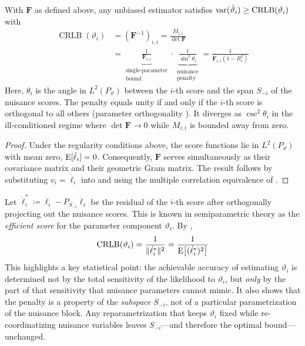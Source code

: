 \documentclass{IEEEtran}
\begin{document}
\begin{corollary}
  \label{cor:crb}
  With $\mathbf{F}$ as defined above, any unbiased estimator satisfies $\operatorname{var}(\hat{\vartheta}_{i}) \ge \operatorname{CRLB}(\vartheta_{i})$ with
  \begin{equation}\label{eq:crb-angle}
    \begin{aligned}
      \operatorname{CRLB}(\vartheta_{i})
      &= (\mathbf{F}^{-1})_{i,i}
      = \frac{M_{i,i}}{\det \mathbf{F}} \\
      &= \underbrace{\frac{1}{\mathbf{F}_{i,i}}}_{\substack{\text{single-parameter}\\\text{bound}}}
      \cdot
      \underbrace{\frac{1}{\sin^{2}\theta_{i}}}_{\substack{\text{nuisance}\\\text{penalty}}}
      = \frac{1}{\mathbf{F}_{i,i}(1 - R_{i}^{2})}
    \end{aligned}
  \end{equation}
  Here, $\theta_{i}$ is the angle in $L^{2}(P_{\vartheta})$ between the $i$-th score and the span $S_{-i}$ of the nuisance scores. The penalty equals unity if and only if the $i$-th score is orthogonal to all others (parameter orthogonality \cite{cox1987}). It diverges as $\csc^{2}\theta_{i}$ in the ill-conditioned regime where $\det \mathbf{F} \to 0$ while $M_{i,i}$ is bounded away from zero.
\end{corollary}

\begin{proof}
  Under the regularity conditions above, the score functions lie in $L^{2}(P_{\vartheta})$ with mean zero, $\operatorname{E}[\dot{\ell}_{i}] = 0$. Consequently, $\mathbf{F}$ serves simultaneously as their covariance matrix and their geometric Gram matrix. The result follows by substituting $v_{i} = \dot{\ell}_{i}$ into  and using the multiple correlation equivalence of .
\end{proof}

\begin{remark}
  \label{rem:efficient-score}
  Let $\dot{\ell}_{i}^{*} \coloneq \dot{\ell}_{i} - P_{S_{-i}}\dot{\ell}_{i}$ be the residual of the $i$-th score after orthogonally projecting out the nuisance scores. This is known in semiparametric theory \cite{bickel1993} as the \emph{efficient score} for the parameter component $\vartheta_{i}$. By ,
  \begin{equation*}
    \operatorname{CRLB}(\vartheta_{i})
    = \frac{1}{\lVert\dot{\ell}_{i}^{*}\rVert^{2}}
    = \frac{1}{\operatorname{E}\bigl[(\dot{\ell}_{i}^{*})^{2}\bigr]}
  \end{equation*}
  This highlights a key statistical point: the achievable accuracy of estimating $\vartheta_{i}$ is determined not by the total sensitivity of the likelihood to $\vartheta_{i}$, but \emph{only} by the part of that sensitivity that nuisance parameters cannot mimic. It also shows that the penalty is a property of the \emph{subspace} $S_{-i}$, not of a particular parametrization of the nuisance block. Any reparametrization that keeps $\vartheta_{i}$ fixed while re-coordinatizing nuisance variables leaves $S_{-i}$---and therefore the optimal bound---unchanged.
\end{remark}
\end{document}
